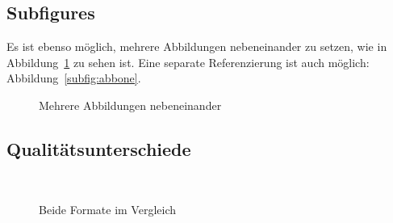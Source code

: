 \subsection{Subfigures}
Es ist ebenso möglich, mehrere Abbildungen nebeneinander zu setzen, wie in Abbildung~\ref{fig:Beide} zu sehen ist. Eine separate Referenzierung ist auch möglich: Abbildung~\ref{subfig:abbone}.
\begin{figure}[bth]
  \hfill
  \caption{Mehrere Abbildungen nebeneinander}
  \label{fig:Beide}
\end{figure}


\subsection{Qualitätsunterschiede}
\begin{figure}[p]
	\centering
   \\
  \caption{Beide Formate im Vergleich}
  \label{fig:pdfvsjpg}
\end{figure}

